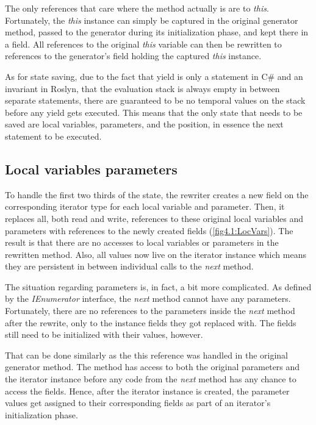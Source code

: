 The only references that care where the method actually is are to \emph{this}. Fortunately, the \emph{this} instance can simply be captured in the original generator method, passed to the generator during its initialization phase, and kept there in a field. All references to the original \emph{this} variable can then be rewritten to references to the generator’s field holding the captured \emph{this} instance.

As for state saving, due to the fact that yield is only a statement in C\# and an invariant in Roslyn, that the evaluation stack is always empty in between separate statements, there are guaranteed to be no temporal values on the stack before any yield gets executed. This means that the only state that needs to be saved are local variables, parameters, and the position, in essence the next statement to be executed.


\subsection{Local variables parameters}

To handle the first two thirds of the state, the rewriter creates a new field on the corresponding iterator type for each local variable and parameter. Then, it replaces all, both read and write, references to these original local variables and parameters with references to the newly created fields (\autoref{fig4.1:LocVars}). The result is that there are no accesses to local variables or parameters in the rewritten method. Also, all values now live on the iterator instance which means they are persistent in between individual calls to the \emph{next} method.

The situation regarding parameters is, in fact, a bit more complicated. As defined by the \emph{IEnumerator} interface, the \emph{next} method cannot have any parameters. Fortunately, there are no references to the parameters inside the \emph{next} method after the rewrite, only to the instance fields they got replaced with. The fields still need to be initialized with their values, however.

That can be done similarly as the this reference was handled in the original generator method. The method has access to both the original parameters and the iterator instance before any code from the \emph{next} method has any chance to access the fields. Hence, after the iterator instance is created, the parameter values get assigned to their corresponding fields as part of an iterator’s initialization phase.

